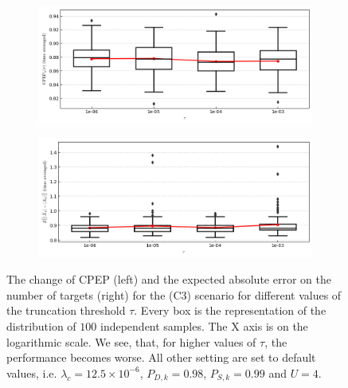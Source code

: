 \begin{figure}
    \centering
    \begin{subfigure}[]{0.48\linewidth}
        \centering
        \includegraphics[width=\linewidth]{figures/c3-tau-cpep.png}
    \end{subfigure}
    \hfill
    \begin{subfigure}[]{0.48\linewidth}
        \centering
        \includegraphics[width=\linewidth]{figures/c3-tau-eae.png}
    \end{subfigure}
  \caption[(C3). Change of performance depending on the prune threshold.]{The change of CPEP (left) and the expected absolute error on the number of targets (right) for the (C3) scenario for different values of the truncation threshold $\tau$. Every box is the representation of the distribution of $100$ independent samples. The X axis is on the logarithmic scale. We see, that, for higher values of $\tau$, the performance becomes worse. All other setting are set to default values, i.e. $\lambda_{c} = 12.5 \times 10^{-6}$, $P_{D,k} = 0.98$, $P_{S,k} = 0.99$ and $U = 4$.}
  \label{fig:c3-tau}
\end{figure}

